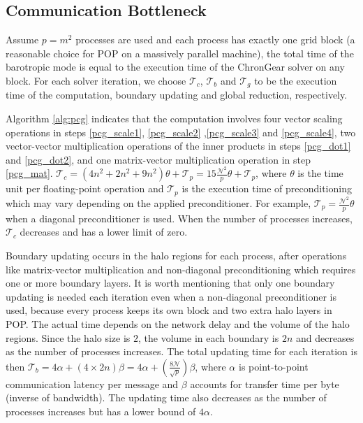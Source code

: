 \subsection{Communication Bottleneck}\label{se:bottleneck}
Assume $p=m^2$ processes are used and each process has exactly one
grid block (a reasonable choice for POP on a massively parallel machine),
the total time of the barotropic mode is equal to the execution time of the ChronGear solver on any block.
For each solver iteration, we choose $\mathcal{T}_c$, $\mathcal{T}_b$ and $\mathcal{T}_g$ to be the execution time of the computation,
boundary updating and global reduction, respectively.


Algorithm \ref{alg:pcg} indicates that the computation involves four vector scaling operations in
steps \ref{pcg_scale1},  \ref{pcg_scale2} ,\ref{pcg_scale3} and  \ref{pcg_scale4},
two vector-vector multiplication operations of the inner products in steps \ref{pcg_dot1} and \ref{pcg_dot2},
and one matrix-vector multiplication operation in step \ref{pcg_mat}. 
$\mathcal{T}_c= (4 n^2 +2n^2+ 9n^2)\theta + \mathcal{T}_{p}  =15\frac{\mathcal{N}^2}{p}\theta+\mathcal{T}_{p}$,
where $\theta$ is the time unit per floating-point operation and
$\mathcal{T}_{p}$ is the execution time of preconditioning which may vary depending on the applied preconditioner.
For example, $\mathcal{T}_{p} =  \frac{\mathcal{N}^2}{p}\theta$ when a diagonal preconditioner is used. 
When the number of processes increases, $\mathcal{T}_c$ decreases and has a lower limit of zero.

Boundary updating occurs in the halo regions for each process, after operations like matrix-vector multiplication and non-diagonal preconditioning which requires one or more boundary layers. 
It is worth mentioning that only one boundary updating is needed each iteration even when a non-diagonal preconditioner is used, because every process keeps its own block and two extra halo layers in POP. 
The actual time depends on the network delay and the volume of the halo regions.
Since the halo size is $2$, the volume in each boundary is $2n$ and decreases as the number of processes increases. 
The total updating time for each iteration is then $\mathcal{T}_b =4\alpha +(4\times 2n)\beta=4\alpha +(\frac{8\mathcal{N}}{\sqrt{p}})\beta $,
where $\alpha$ is point-to-point communication latency per message and $\beta$ accounts for transfer time per byte (inverse of bandwidth). 
The updating time also decreases as the number of processes increases but has a lower bound of $4\alpha$.


